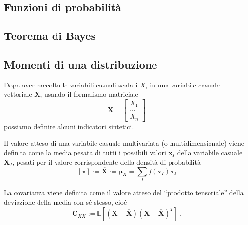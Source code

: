 \subsection{Funzioni di probabilità}
\subsection{Teorema di Bayes}\label{ch:bayes-thm}
\subsection{Momenti di una distribuzione}
Dopo aver raccolto le variabili casuali scalari $X_i$ in una variabile casuale vettoriale $\mathbf{X}$, usando il formalismo matriciale
\begin{equation}
    \mathbf{X} = \begin{bmatrix}  X_1 \\ \dots  \\ X_n \end{bmatrix}
\end{equation}
possiamo definire alcuni indicatori sintetici. 

\begin{definition}
Il valore atteso di una variabile casuale multivariata (o multidimensionale) viene definita come la media pesata di tutti i possibili valori $\mathbf{x}_I$ della variabile casuale $\mathbf{X}_I$, pesati per il valore corrispondente della densità di probabilità
\begin{equation}
    \mathbb{E}[\mathbf{x}] := \overline{\mathbf{X}} := \mathbf{\mu}_X = \sum_{I} f(\mathbf{x}_I) \mathbf{x}_I \ . 
\end{equation}
\end{definition}

\begin{definition}[Covarianza]
La covarianza viene definita come il valore atteso del ``prodotto tensoriale'' della deviazione della media con sé stesso, cioé
\begin{equation}
    \mathbf{C}_{XX} := \mathbb{E}[(\mathbf{X} - \overline{\mathbf{X}})(\mathbf{X} - \overline{\mathbf{X}})^T] \  .
\end{equation}
\end{definition}

